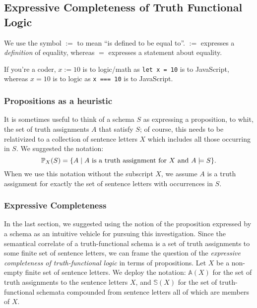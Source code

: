 \subsection{Expressive Completeness of Truth Functional Logic}
\begin{definition}
    We use the symbol $:=$ to mean ``is defined to be equal to''. $:=$ expresses a \emph{definition} of equality, whereas $=$ expresses a statement about equality.

    If you're a coder, $x := 10$ is to logic/math as \verb|let x = 10| is to JavaScript, whereas $x = 10$ is to logic as \verb|x === 10| is to JavaScript.
\end{definition}

\subsubsection*{Propositions as a heuristic}
It is sometimes useful to think of a schema $S$ as expressing a proposition, to whit, the set of truth assignments $A$ that satisfy $S$; of course, this needs to be relativized to a collection of sentence letters $X$ which includes all those occurring in $S$. We suggested the notation: 
\[\prop{S}{X} = \{ A\mid A\  \mbox{is a truth assignment for $X$ and } A\models S\}.
\]
 When we use this notation without the subscript $X$, we assume $A$ is a truth assignment for exactly the set of sentence letters with occurrences in $S$. 

\subsubsection*{Expressive Completeness}
In the last section, we suggested using the notion of the proposition expressed by a schema as an intuitive vehicle for pursuing this investigation. Since the semantical correlate of a truth-functional schema is a set of truth assignments to some finite set of sentence letters, we can frame the question of the \emph{expressive completeness of truth-functional logic} in terms of propositions. Let $X$ be a non-empty finite set of sentence letters. We deploy the notation: $\mathbb{A}(X)$ for the set of truth assignments to the sentence letters $X$, and $\mathbb{S}(X)$ for the set of truth-functional schemata compounded from sentence letters all of which are members of $X$. 

